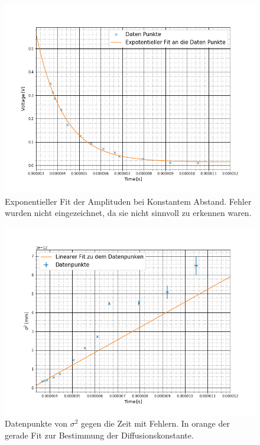 	\begin{figure}[ht]
		\includegraphics[scale=0.43]{Bild/V2Abstand3}
		\centering
		\caption[Exponentieller Fit der Amplituden bei konstantem Abstand]{\small Exponentieller Fit der Amplituden bei Konstantem Abstand. Fehler wurden nicht eingezeichnet, da sie nicht sinnvoll zu erkennen waren.}
		\label{SpannungTau}
	\end{figure}
	\begin{figure}[ht]
		\includegraphics[scale=0.43]{Bild/V2Abstand4}
		\centering
		\caption[Fit zur Bestimmung der Diffusion bei konst. Abstand.]{\small Datenpunkte von $\sigma^2$ gegen die Zeit mit Fehlern. In orange der gerade Fit zur Bestimmung der Diffusionskonstante.}
		\label{SpannungD}
	\end{figure}
